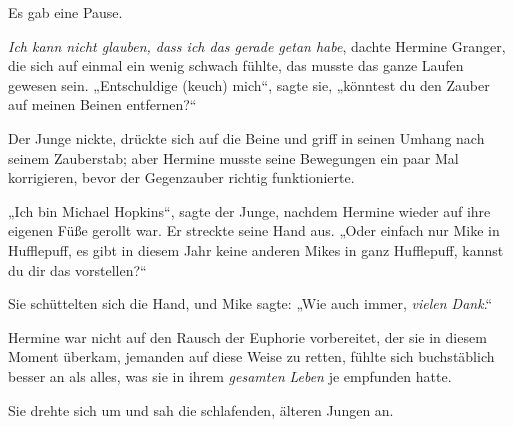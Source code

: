 Es gab eine Pause.

\emph{Ich kann nicht glauben, dass ich das gerade getan habe}, dachte Hermine Granger, die sich auf einmal ein wenig schwach fühlte, das musste das ganze Laufen gewesen sein. „Entschuldige (keuch) mich“, sagte sie, „könntest du den Zauber auf meinen Beinen entfernen?“

Der Junge nickte, drückte sich auf die Beine und griff in seinen Umhang nach seinem Zauberstab; aber Hermine musste seine Bewegungen ein paar Mal korrigieren, bevor der Gegenzauber richtig funktionierte.

„Ich bin Michael Hopkins“, sagte der Junge, nachdem Hermine wieder auf ihre eigenen Füße gerollt war. Er streckte seine Hand aus. „Oder einfach nur Mike in Hufflepuff, es gibt in diesem Jahr keine anderen Mikes in ganz Hufflepuff, kannst du dir das vorstellen?“

Sie schüttelten sich die Hand, und Mike sagte: „Wie auch immer, \emph{vielen Dank}.“

Hermine war nicht auf den Rausch der Euphorie vorbereitet, der sie in diesem Moment überkam, jemanden auf diese Weise zu retten, fühlte sich buchstäblich besser an als alles, was sie in ihrem \emph{gesamten} \emph{Leben} je empfunden hatte.

Sie drehte sich um und sah die schlafenden, älteren Jungen an.

